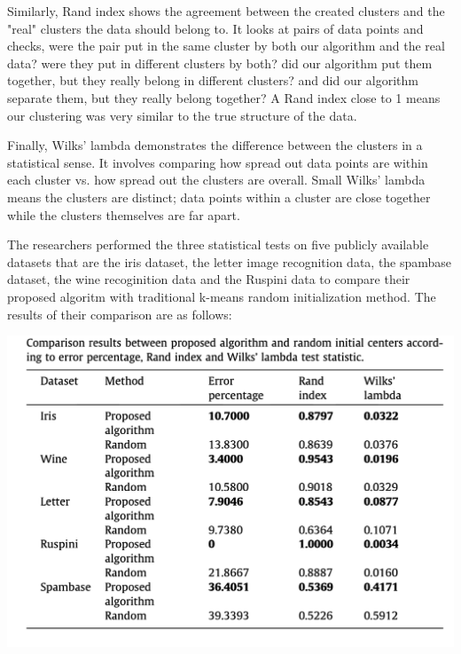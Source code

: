 \documentclass[12pt,letterpaper]{article}
\begin{document}
\vspace{.25cm}

Similarly, Rand index shows the agreement between the created clusters and the "real" clusters the data should belong to. It looks at pairs of data points and checks, were the pair put in the same cluster by both our algorithm and the real data? were they put in different clusters by both? did our algorithm put them together, but they really belong in different clusters? and did our algorithm separate them, but they really belong together? 
A Rand index close to 1 means our clustering was very similar to the true structure of the data.

\vspace{.25cm}

Finally, Wilks' lambda demonstrates the difference between the clusters in a statistical sense. It involves comparing how spread out data points are within each cluster vs. how spread out the clusters are overall. Small Wilks' lambda means the clusters are distinct; data points within a cluster are close together while the clusters themselves are far apart.

\vspace{.25cm}

The researchers performed the three statistical tests on five publicly available datasets that are the iris dataset, the letter image recognition data, the spambase dataset, the wine recoginition data and the Ruspini data to compare their proposed algoritm with traditional k-means random initialization method. The results of their comparison are as follows:

\vspace{.25cm}
\includegraphics[scale=0.8]{image4}
\end{document}
